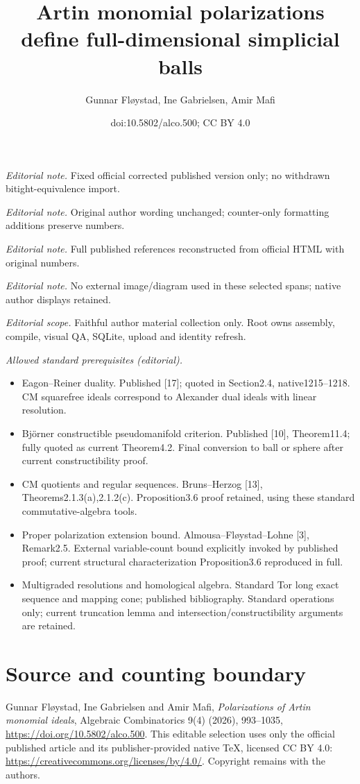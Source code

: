\documentclass[10pt,a4paper]{article}
\title{Artin monomial polarizations define full-dimensional simplicial balls}
\author{Gunnar Fløystad, Ine Gabrielsen, Amir Mafi}
\date{doi:10.5802/alco.500; CC BY 4.0}
\theoremstyle{definition}
\theoremstyle{remark}
\theoremstyle{plain}
\begin{document}
\maketitle
\noindent\textit{Editorial note.} Fixed official corrected published version only; no withdrawn bitight-equivalence import.\par\medskip
\noindent\textit{Editorial note.} Original author wording unchanged; counter-only formatting additions preserve numbers.\par\medskip
\noindent\textit{Editorial note.} Full published references reconstructed from official HTML with original numbers.\par\medskip
\noindent\textit{Editorial note.} No external image/diagram used in these selected spans; native author displays retained.\par\medskip
\noindent\textit{Editorial scope.} Faithful author material collection only. Root owns assembly, compile, visual QA, SQLite, upload and identity refresh.\par\medskip
\noindent\textit{Allowed standard prerequisites (editorial).}\begin{itemize}
\item Eagon–Reiner duality. Published [17]; quoted in Section2.4, native1215–1218. CM squarefree ideals correspond to Alexander dual ideals with linear resolution.
\item Björner constructible pseudomanifold criterion. Published [10], Theorem11.4; fully quoted as current Theorem4.2. Final conversion to ball or sphere after current constructibility proof.
\item CM quotients and regular sequences. Bruns–Herzog [13], Theorems2.1.3(a),2.1.2(c). Proposition3.6 proof retained, using these standard commutative-algebra tools.
\item Proper polarization extension bound. Almousa–Fløystad–Lohne [3], Remark2.5. External variable-count bound explicitly invoked by published proof; current structural characterization Proposition3.6 reproduced in full.
\item Multigraded resolutions and homological algebra. Standard Tor long exact sequence and mapping cone; published bibliography. Standard operations only; current truncation lemma and intersection/constructibility arguments are retained.
\end{itemize}\medskip
\section*{Source and counting boundary}
Gunnar Fløystad, Ine Gabrielsen and Amir Mafi, \emph{Polarizations of Artin monomial ideals}, Algebraic Combinatorics 9(4) (2026), 993--1035, \url{https://doi.org/10.5802/alco.500}.
This editable selection uses only the official published article and its publisher-provided native TeX, licensed CC BY 4.0: \url{https://creativecommons.org/licenses/by/4.0/}. Copyright remains with the authors.
\end{document}
